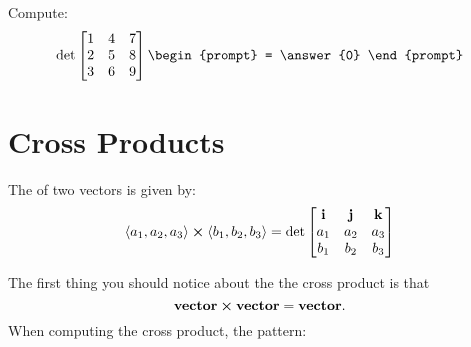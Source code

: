 \documentclass{ximera}
\begin{document}
\begin{question}
  Compute:
  \[
  \det
  \begin{bmatrix} 
    1 & 4 & 7\\
    2 & 5 & 8\\
    3 & 6 & 9\\
  \end{bmatrix}
  \begin{prompt}
    = \answer{0}
  \end{prompt}
  \]
\end{question}








\section{Cross Products}

\begin{definition}
  The  of two vectors is given by: 
  \[
  \left\langle a_1,a_2,a_3\right\rangle \boldsymbol\times \left\langle b_1,b_2,b_3\right\rangle = \det
  \begin{bmatrix}
    \mathbf{i} & \mathbf{j} & \mathbf{k}\\
    a_1 & a_2 & a_3\\
    b_1 & b_2 & b_3
  \end{bmatrix}
  \]
\end{definition}
The first thing you should notice about the the cross product is that
\[
\mathbf{vector}\boldsymbol\times \mathbf{vector} = \mathbf{vector}.
\]
  When computing the cross product, the pattern:
\end{document}
